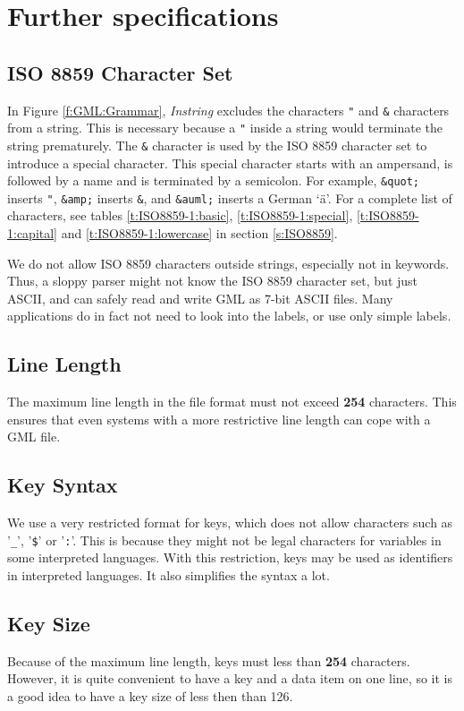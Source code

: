 \section{Further specifications}

\subsection{ISO 8859 Character Set}

In Figure \ref{f:GML:Grammar}, \emph{Instring} excludes the
characters \verb|"| and \verb|&| characters from a string.  This
is necessary because a \verb|"| inside a string would terminate
the string prematurely.  The \verb|&| character is used by the
ISO 8859 character set to introduce a special character. This
special character starts with an ampersand, is followed by a name
and is terminated by a semicolon.  For example, \verb|&quot;|
inserts \verb|"|, \verb|&amp;| inserts \verb|&|, and
\verb|&auml;| inserts a German `\"{a}'.  For a complete list of
characters, see tables \ref{t:ISO8859-1:basic},
\ref{t:ISO8859-1:special}, \ref{t:ISO8859-1:capital} and
\ref{t:ISO8859-1:lowercase} in section \ref{s:ISO8859}.

We do not allow ISO 8859 characters outside strings, especially
not in keywords. Thus, a sloppy parser might not know the ISO
8859 character set, but just ASCII, and can safely read and write
GML as 7-bit ASCII files. Many applications do in fact not need
to look into the labels, or use only simple labels.

\subsection{Line Length}
The maximum line length in the file format must not exceed
\textbf{254} characters. This ensures that even systems with a
more restrictive line length can cope with a GML file.

\subsection{Key Syntax}
We use a very restricted format for keys, which does not allow
characters such as '\texttt{\_}', '\texttt{\$}' or '\texttt{:}'.
This is because they might not be legal characters
for variables in some interpreted languages.  With this
restriction, keys may be used as identifiers in interpreted
languages.  It also simplifies the syntax a lot.

\subsection{Key Size}
Because of the maximum line length, keys must less than
\textbf{254} characters. However, it is quite convenient to have
a key and a data item on one line, so it is a good idea to have a
key size of less then than 126.

